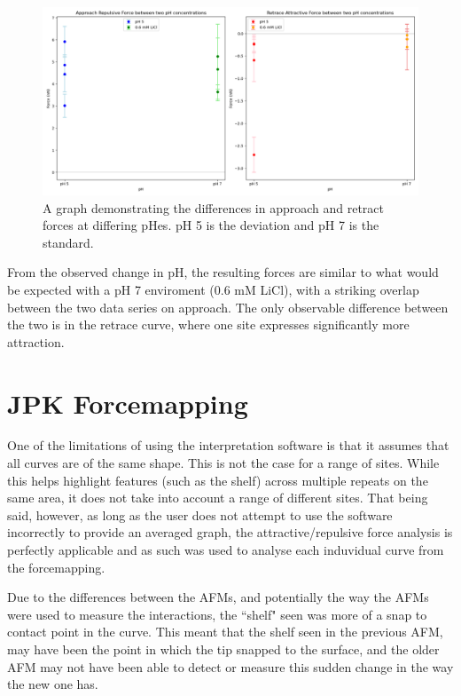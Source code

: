 \begin{figure}[h!]
\centering
\includegraphics[width=\textwidth]{chapter7/pH/Overall image.png}
\caption{A graph demonstrating the differences in approach and retract forces at differing pHes. pH 5 is the deviation and pH 7 is the standard.}
\label{fig:pHOverall}
\end{figure}

From the observed change in pH, the resulting forces are similar to what would be expected with a pH 7 enviroment (0.6 mM LiCl), with a striking overlap between the two data series on approach. The only observable difference between the two is in the retrace curve, where one site expresses significantly more attraction.


\newpage
\section{JPK Forcemapping}

One of the limitations of using the interpretation software is that it assumes that all curves are of the same shape. This is not the case for a range of sites. While this helps highlight features (such as the shelf) across multiple repeats on the same area, it does not take into account a range of different sites. That being said, however, as long as the user does not attempt to use the software incorrectly to provide an averaged graph, the attractive/repulsive force analysis is perfectly applicable and as such was used to analyse each induvidual curve from the forcemapping.

Due to the differences between the AFMs, and potentially the way the AFMs were used to measure the interactions, the ``shelf" seen was more of a snap to contact point in the curve. This meant that the shelf seen in the previous AFM, may have been the point in which the tip snapped to the surface, and the older AFM may not have been able to detect or measure this sudden change in the way the new one has. 

